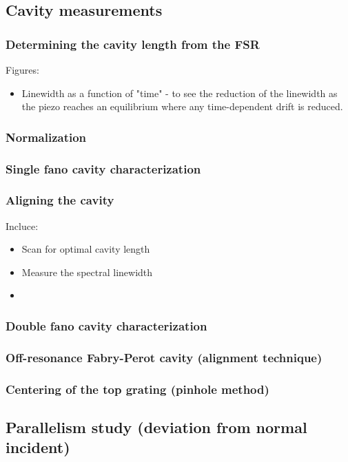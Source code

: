 \subsection{Cavity measurements}\label{sec:cavity_measurements}

\subsubsection{Determining the cavity length from the FSR}

Figures: 
\begin{itemize}
    \item Linewidth as a function of "time" - to see the reduction of the linewidth as the piezo reaches an equilibrium where any time-dependent drift is reduced. 
\end{itemize}

\subsubsection{Normalization}

\subsubsection{Single fano cavity characterization} 

\subsubsection{Aligning the cavity}

Incluce: 
\begin{itemize}
    \item Scan for optimal cavity length
    \item Measure the spectral linewidth
    \item 
\end{itemize}

\subsubsection{Double fano cavity characterization}

\subsubsection{Off-resonance Fabry-Perot cavity (alignment technique)}

\subsubsection{Centering of the top grating (pinhole method)}

\subsection{Parallelism study (deviation from normal incident)}